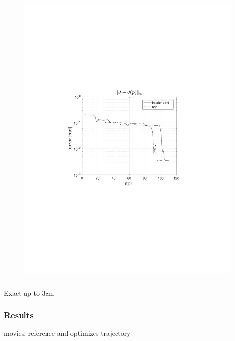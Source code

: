 \begin{frame}
\begin{columns}[t]
\begin{figure}
                \includegraphics[trim=4cm 9cm 4cm 8.5cm, clip=true, width=\linewidth]{img/convPlotT}
            \end{figure}
    \end{columns}

    \begin{center}
        Exact up to $3\text{cm}$
    \end{center}
\end{frame}

\begin{frame}
    \frametitle{Results}

    movies: reference and optimizes trajectory
\end{frame}

